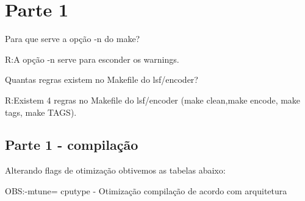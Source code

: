 \documentclass[10pt,a4paper]{article}
\begin{document}
\setlength{\parskip}{0pt}
\setlength{\parsep}{0pt}
\setlength{\headsep}{0pt}
\setlength{\topskip}{0pt}
\setlength{\topmargin}{0pt}
\setlength{\topsep}{0pt}
\setlength{\partopsep}{0pt}


\begin{minipage}{5cm}
  \vspace{2mm}
\end{minipage}

\vspace{-3mm}

\section{Parte 1}
Para que serve a opção -n do make?

R:A opção -n serve para esconder os warnings.

Quantas regras existem no Makefile do lsf/encoder?

R:Existem 4 regras no Makefile do lsf/encoder (make clean,make encode, make tags, make TAGS).

\subsection{Parte 1 - compilação}
Alterando flags de otimização obtivemos as tabelas abaixo:

OBS:-mtune= cpu\underline{}type - Otimização compilação de acordo com arquitetura
\end{document}

